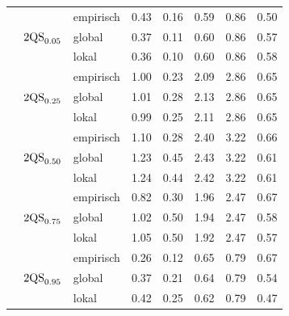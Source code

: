 \begin{table}[!h]
\begin{tabularx}{0.95\textwidth}{L L L R R R R R}
\addlinespace[0.4em]
&  & empirisch & 0.43 & 0.16 & 0.59 & 0.86 & 0.50\\
&& global & 0.37 & 0.11 & 0.60 & 0.86 & 0.57\\
&& lokal & 0.36 & 0.10 & 0.60 & 0.86 & 0.58\\
\addlinespace[0.4em]
&  & empirisch & 1.00 & 0.23 & 2.09 & 2.86 & 0.65\\
&& global & 1.01 & 0.28 & 2.13 & 2.86 & 0.65\\
&& lokal & 0.99 & 0.25 & 2.11 & 2.86 & 0.65\\
\addlinespace[0.4em]
&  & empirisch & 1.10 & 0.28 & 2.40 & 3.22 & 0.66\\
&& global & 1.23 & 0.45 & 2.43 & 3.22 & 0.61\\
&& lokal & 1.24 & 0.44 & 2.42 & 3.22 & 0.61\\
\addlinespace[0.4em]
&  & empirisch & 0.82 & 0.30 & 1.96 & 2.47 & 0.67\\
&& global & 1.02 & 0.50 & 1.94 & 2.47 & 0.58\\
&& lokal & 1.05 & 0.50 & 1.92 & 2.47 & 0.57\\
\addlinespace[0.4em]
&  & empirisch & 0.26 & 0.12 & 0.65 & 0.79 & 0.67\\
&& global & 0.37 & 0.21 & 0.64 & 0.79 & 0.54\\
&& lokal & 0.42 & 0.25 & 0.62 & 0.79 & 0.47\\
\bottomrule
\end{tabularx}
\label{tab:decomp}
\end{table}
